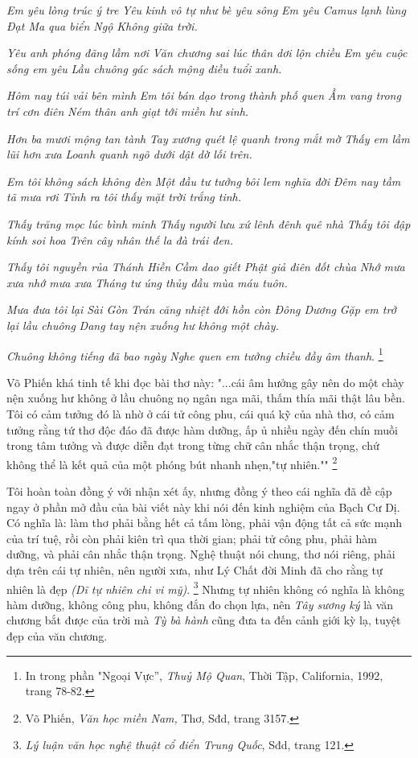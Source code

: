 \documentclass[../main.tex]{subfiles}
\begin{document}
\begin{multicols}{2}
\textit{Em yêu lòng trúc ý tre} 
\textit{Yêu kinh vô tự như bè yêu sông} 
\textit{Em yêu Camus lạnh lùng} 
\textit{Đạt Ma qua biển Ngộ Không giữa trời.} 
 
\textit{Yêu anh phóng đãng lầm nơi} 
\textit{Văn chương sai lúc thân dơi lộn chiều} 
\textit{Em yêu cuộc sống em yêu} 
\textit{Lầu chuông gác sách mộng điều tuổi xanh.} 
 
\textit{Hôm nay túi vải bên mình} 
\textit{Em tôi bán dạo trong thành phố quen} 
\textit{Ầm vang trong trí cơn điên} 
\textit{Ném thân anh giạt tới miền hư sinh.} 
 
\textit{Hơn ba mươi mộng tan tành} 
\textit{Tay xương quét lệ quanh trong mắt mờ} 
\textit{Thấy em lầm lũi hơn xưa} 
\textit{Loanh quanh ngõ dưới dật dờ lối trên.} 
 
\textit{Em tôi không sách không đèn} 
\textit{Một đầu tư tưởng bôi lem nghĩa đời} 
\textit{Đêm nay tầm tã mưa rơi} 
\textit{Tỉnh ra tôi thấy mặt trời trắng tinh.} 
 
\textit{Thấy trăng mọc lúc bình minh} 
\textit{Thấy người lưu xứ lênh đênh quê nhà} 
\textit{Thấy tôi đập kính soi hoa} 
\textit{Trên cây nhân thế la đà trái đen.} 
 
\textit{Thấy tôi nguyền rủa Thánh Hiền} 
\textit{Cầm dao giết Phật giả điên đốt chùa} 
\textit{Nhớ mưa xưa nhớ mưa xưa} 
\textit{Tháng tư úng thủy đầu mùa máu tuôn.} 
 
\textit{Mưa đưa tôi lại Sài Gòn} 
\textit{Trán căng nhiệt đới hồn còn Đông Dương} 
\textit{Gặp em trở lại lầu chuông} 
\textit{Dang tay nện xuống hư không một chày.} 
 
\textit{Chuông không tiếng đã bao ngày} 
\textit{Nghe quen em tưởng chiều đầy âm thanh}. \footnote{
In trong phần "Ngoại Vực”, \textit{Thuỷ Mộ Quan}, Thời Tập, California, 1992, trang 78-82.}  
 
Võ Phiến khá tinh tế khi đọc bài thơ này: "...cái âm hưởng gây nên do một chày nện xuống hư không ở lầu chuông nọ ngân nga mãi, thấm thía mãi thật lâu bền. Tôi có cảm tưởng đó là nhờ ở cái tử công phu, cái quá kỹ của nhà thơ, có cảm tưởng rằng tứ thơ độc đáo đã được hàm dưỡng, ấp ủ nhiều ngày đến chín muồi trong tâm tưởng và được diễn đạt trong từng chữ cân nhắc thận trọng, chứ không thể là kết quả của một phóng bút nhanh nhẹn,"tự nhiên."" \footnote{
Võ Phiến, \textit{Văn học miền Nam, }Thơ, Sđd, trang 3157.}  
 
Tôi hoàn toàn đồng ý với nhận xét ấy, nhưng đồng ý theo cái nghĩa đã đề cập ngay ở phần mở đầu của bài viết này khi nói đến kinh nghiệm của Bạch Cư Dị. Có nghĩa là: làm thơ phải bằng hết cả tấm lòng, phải vận động tất cả sức mạnh của trí tuệ, rồi còn phải kiên trì qua thời gian; phải tử công phu, phải hàm dưỡng, và phải cân nhắc thận trọng. Nghệ thuật nói chung, thơ nói riêng, phải dựa trên cái tự nhiên, nên người xưa, như Lý Chất đời Minh đã cho rằng tự nhiên là đẹp \textit{(Dĩ tự nhiên chi vi mỹ)}. \footnote{
\textit{Lý luận văn học nghệ thuật cổ điển Trung Quốc}, Sđd, trang 121.}  Nhưng tự nhiên không có nghĩa là không hàm dưỡng, không công phu, không đắn đo chọn lựa, nên \textit{Tây sương ký} là văn chương bắt được của trời mà \textit{Tỳ bà hành} cũng đưa ta đến cảnh giới kỳ lạ, tuyệt đẹp của văn chương. 
 

\end{multicols}
\end{document}

